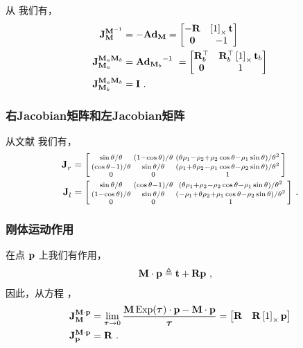 从  我们有，
%
\begin{align}
\mjac{\bfM\inv}{\bfM} &= -\Ad[\SE(2)]{\bfM} = \begin{bmatrix} -\bfR & \hatx{1}\bft \\ \bf0 & -1 \end{bmatrix}  \\
\mjac{\bfM_a\bfM_b}{\bfM_a} &= \Ad[\SE(2)]{\bfM_b}\inv ~= \begin{bmatrix} \bfR_b\tr & \bfR_b\tr\hatx{1}\bft_b \\ \bf0 & 1 \end{bmatrix} \\
\mjac{\bfM_a\bfM_b}{\bfM_b} &= \bfI 
~.
\end{align}

\subsubsection{右Jacobian矩阵和左Jacobian矩阵}

从文献 \cite[pag.~36]{CHIRIKJIAN-11} 我们有，
%
\begin{align}
\mjac{}{r} &= \begin{bsmallmatrix}
\sin\theta/\theta & (1-\cos\theta)/\theta & (\theta \rho_1 - \rho_2 + \rho_2 \cos\theta - \rho_1 \sin\theta)/\theta^2 \\
(\cos\theta-1)/\theta & \sin\theta/\theta & (\rho_1 + \theta \rho_2 - \rho_1 \cos\theta - \rho_2 \sin\theta)/\theta^2 \\
0 & 0 & 1
\end{bsmallmatrix} \\
\mjac{}{l} &= \begin{bsmallmatrix}
\sin\theta/\theta & (\cos\theta-1)/\theta & (\theta \rho_1 + \rho_2 - \rho_2 \cos\theta - \rho_1 \sin\theta)/\theta^2 \\
(1-\cos\theta)/\theta & \sin\theta/\theta & (-\rho_1 + \theta \rho_2 + \rho_1 \cos\theta - \rho_2 \sin\theta)/\theta^2 \\
0 & 0 & 1
\end{bsmallmatrix} 
~.
\end{align}

\subsubsection{刚体运动作用}

在点 $\bfp$ 上我们有作用，
%
\begin{align}
\bfM\cdot\bfp &\te \bft+\bfR\bfp
~,
\end{align}
%
因此，从方程  ，
%
\begin{align}
\mjac{\bfM\cdot\bfp}{\bfM} 
  &= 
  \lim_{\bftau\to0}\frac{\bfM\Exp(\bftau)\cdot\bfp - \bfM\cdot\bfp}{\bftau}
  = 
  \begin{bmatrix}\bfR & \bfR\hatx{1}\bfp\end{bmatrix} \\
\mjac{\bfM\cdot\bfp}{\bfp} &= \bfR 
~.
\end{align}
%

